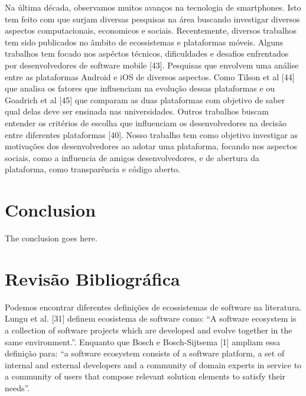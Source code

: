 \documentclass[conference]{IEEEtran}
\begin{document}
Na última década, observamos muitos avanços na tecnologia de smartphones. Isto tem feito com que surjam diversas pesquisas na área buscando investigar diversos aspectos computacionais, economicos e sociais. Recentemente, diversos trabalhos tem sido publicados no âmbito de ecossistemas e plataformas móveis. Alguns trabalhos tem focado nos aspéctos técnicos, dificuldades e desafios enfrentados por desenvolvedores de software mobile [43]. Pesquisas que envolvem uma análise entre as plataformas Android e iOS de diversos aspectos. Como Tilson et al [44] que analisa os fatores que influenciam na evolução dessas plataformas e ou Goadrich et al [45] que comparam as duas plataformas com objetivo de saber qual delas deve ser ensinada nas universidades. Outros trabalhos buscam entender os critérios de escolha que influenciam os desenvolvedores na decisão entre diferentes plataformas [40]. Nosso trabalho tem como objetivo investigar as motivações dos desenvolvedores ao adotar uma plataforma, focando nos aspectos sociais, como a influencia de amigos desenvolvedores, e de abertura da plataforma, como transparência e código aberto.


\section{Conclusion}
The conclusion goes here.

\section{Revisão Bibliográfica}

Podemos encontrar diferentes definições de ecossistemas de software na literatura. Lungu et al. [31] definem ecosistema de software como: “A software ecosystem is a collection of software projects which are developed and evolve together in the same environment.”. Enquanto que Bosch e Bosch-Sijtsema [1] ampliam essa definição para: “a software ecosystem consists of a software platform, a set of internal and external developers and a community of domain experts in service to a community of users that compose relevant solution elements to satisfy their needs”.  
\end{document}
